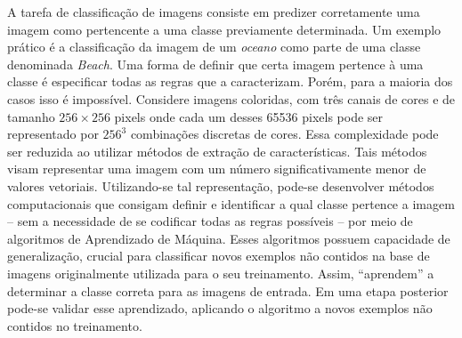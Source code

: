 A tarefa de classificação de imagens consiste em predizer corretamente uma imagem como pertencente a uma classe previamente determinada. Um exemplo prático é a classificação da imagem de um \textit{oceano} como parte de uma classe denominada \textit{Beach}. Uma forma de definir que certa imagem pertence à uma classe é especificar todas as regras que a caracterizam.
Porém, para a maioria dos casos isso é impossível. Considere imagens coloridas, com três canais de cores e de tamanho $256\times256$ pixels onde cada um desses 65536 pixels pode ser representado por $256^3$ combinações discretas de cores. Essa complexidade pode ser reduzida ao utilizar métodos de extração de características. Tais métodos visam representar uma imagem com um número significativamente menor de valores vetoriais. Utilizando-se tal representação, pode-se desenvolver métodos computacionais que consigam definir e identificar a qual classe pertence a imagem -- sem a necessidade de se codificar todas as regras possíveis -- por meio de algoritmos de Aprendizado de Máquina. Esses algoritmos possuem capacidade de generalização, crucial para classificar novos exemplos não contidos na base de imagens originalmente utilizada para o seu treinamento. Assim, ``aprendem'' a determinar a classe correta para as imagens de entrada. Em uma etapa posterior pode-se validar esse aprendizado, aplicando o algoritmo a novos exemplos não contidos no treinamento.

